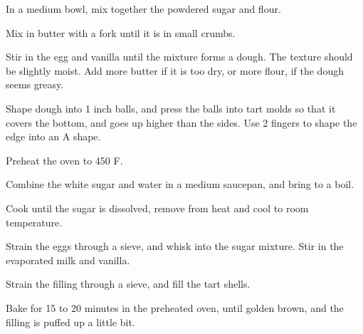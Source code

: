 In a medium bowl, mix together the powdered sugar and flour. 

Mix in butter with a fork until it is in small crumbs. 

Stir in the egg and vanilla until the mixture forms a dough. 
The texture should be slightly moist. Add more butter if it is too dry, or more flour, if the dough seems greasy. 

Shape dough into 1  inch balls, and press the balls into tart molds so that it covers the bottom, and goes up higher than the sides. 
Use 2 fingers to shape the edge into an A shape.

Preheat the oven to 450 \degree F.

Combine the white sugar and water in a medium saucepan, and bring to a boil. 

Cook until the sugar is dissolved, remove from heat and cool to room temperature. 

Strain the eggs through a sieve, and whisk into the sugar mixture. 
Stir in the evaporated milk and vanilla. 
 
Strain the filling through a sieve, and fill the tart shells.

Bake for 15 to 20 minutes in the preheated oven, until golden brown, and the filling is puffed up a little bit.
